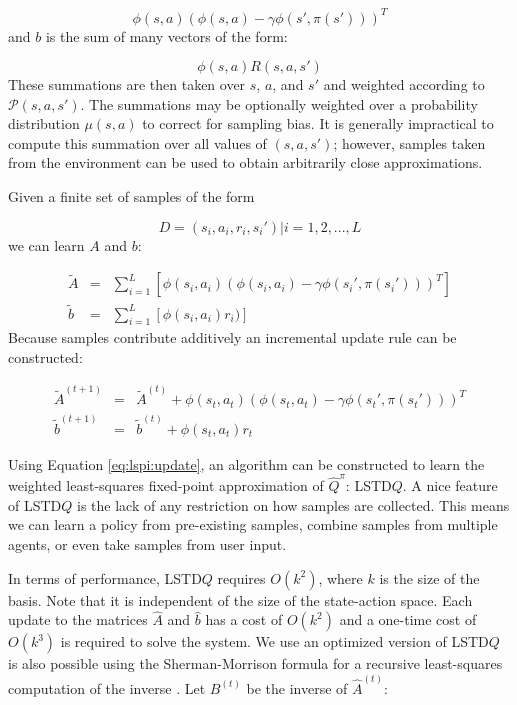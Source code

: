 \[
    \phi(s,a)(\phi(s,a) - \gamma\phi(s',\pi(s')))^T
\]
and $b$ is the sum of many vectors of the form:

\[
    \phi(s,a)R(s,a,s')
\]
These summations are then taken over $s$, $a$, and $s'$ and weighted according to $\mathcal{P}(s,a,s')$. The summations may be optionally weighted over a probability distribution $\mu(s,a)$ to correct for sampling bias. It is generally impractical to compute this summation over all values of $(s,a,s')$; however, samples taken from the environment can be used to obtain arbitrarily close approximations.

Given a finite set of samples of the form

\[
    D = { (s_i,a_i,r_i,s_i') | i = 1,2,...,L}
\]
we can learn $A$ and $b$:

\[
    \begin{array}{rcl}
        \tilde{A} &=& \displaystyle\sum_{i=1}^L[\phi(s_i,a_i)(\phi(s_i,a_i) - \gamma\phi(s_i',\pi(s_i')))^T] \\
        \tilde{b} &=& \displaystyle\sum_{i=1}^L[\phi(s_i,a_i)r_i)]
    \end{array}
\]
Because samples contribute additively an incremental update rule can be constructed:

\begin{equation}
\label{eq:lspi:update}
    \begin{array}{rcl}
        \tilde{A}^{(t+1)} &=& \tilde{A}^{(t)} + \phi(s_t,a_t)(\phi(s_t,a_t) - \gamma\phi(s_t',\pi(s_t')))^T \\
        \tilde{b}^{(t+1)} &=& \tilde{b}^{(t)} + \phi(s_t,a_t)r_t
    \end{array}
\end{equation}

Using Equation \ref{eq:lspi:update}, an algorithm can be constructed to learn the weighted least-squares fixed-point approximation of $\hat{Q}^\pi$: LSTD$Q$. A nice feature of LSTD$Q$ is the lack of any restriction on how samples are collected. This means we can learn a policy from pre-existing samples, combine samples from multiple agents, or even take samples from user input.

In terms of performance, LSTD$Q$ requires $O(k^2)$, where $k$ is the size of the basis. Note that it is independent of the size of the state-action space. Each update to the matrices $\hat{A}$ and $\hat{b}$ has a cost of $O(k^2)$ and a one-time cost of $O(k^3)$ is required to solve the system. We use an optimized version of LSTD$Q$ is also possible using the Sherman-Morrison formula for a recursive least-squares computation of the inverse \cite{lspi}. Let $B^{(t)}$ be the inverse of $\hat{A}^{(t)}$:

